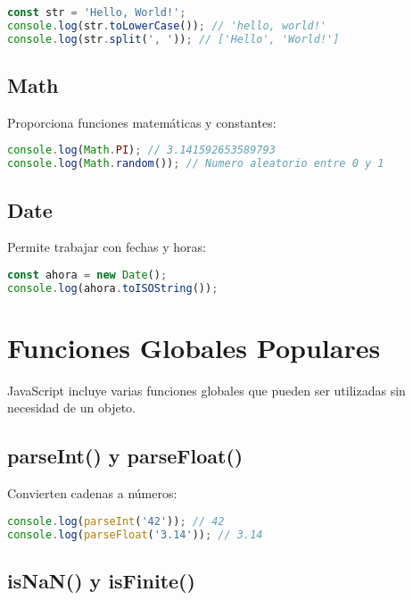 \documentclass{book}
\begin{document}
\begin{lstlisting}[language=JavaScript]
const str = 'Hello, World!';
console.log(str.toLowerCase()); // 'hello, world!'
console.log(str.split(', ')); // ['Hello', 'World!']
\end{lstlisting}

\subsection{Math}

Proporciona funciones matemáticas y constantes:

\begin{lstlisting}[language=JavaScript]
console.log(Math.PI); // 3.141592653589793
console.log(Math.random()); // Numero aleatorio entre 0 y 1
\end{lstlisting}

\subsection{Date}

Permite trabajar con fechas y horas:

\begin{lstlisting}[language=JavaScript]
const ahora = new Date();
console.log(ahora.toISOString());
\end{lstlisting}

\section{Funciones Globales Populares}

JavaScript incluye varias funciones globales que pueden ser utilizadas sin necesidad de un objeto.

\subsection{parseInt() y parseFloat()}

Convierten cadenas a números:

\begin{lstlisting}[language=JavaScript]
console.log(parseInt('42')); // 42
console.log(parseFloat('3.14')); // 3.14
\end{lstlisting}

\subsection{isNaN() y isFinite()}
\end{document}
